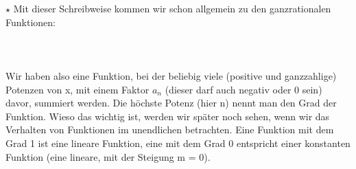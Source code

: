 		\(\star\) Mit dieser Schreibweise kommen wir schon allgemein zu den
		ganzrationalen Funktionen:
		\\ \\
		\formel{\[f(x)=a_n \cdot x^n+a_{n-1} \cdot x^{n-1}+\ldots +a_1 \cdot x+a_0\]}
		\\ \\
		Wir haben also eine Funktion, bei der beliebig viele (positive und
		ganzzahlige) Potenzen von x, mit einem Faktor \(a_n\) (dieser darf auch
		negativ oder 0 sein) davor, summiert werden. Die höchste Potenz (hier n) nennt
		man den Grad der Funktion. Wieso das wichtig ist, werden wir später noch
		sehen, wenn wir das Verhalten von Funktionen im unendlichen betrachten. Eine
		Funktion mit dem Grad 1 ist eine lineare Funktion, eine mit dem Grad 0
		entspricht einer konstanten Funktion (eine lineare, mit der Steigung m = 0).


